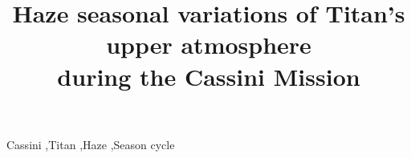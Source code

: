 \documentclass[review, authoryear, hidelinks]{elsarticle}
\begin{document}
\begin{frontmatter}
    \title{Haze seasonal variations of Titan's upper atmosphere\\during the Cassini Mission}

    

    \begin{abstract}
        
    \end{abstract}

    \begin{keyword}
    Cassini \sep Titan \sep Haze \sep Season cycle
    \end{keyword}
\end{frontmatter}

\begin{linenumbers}

    
    
    
    
    
    
    

\end{linenumbers}


\end{document}
